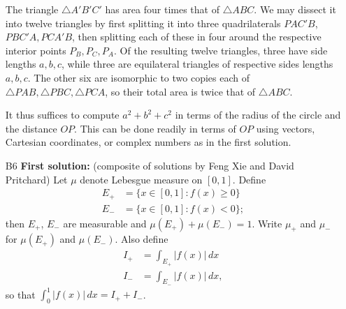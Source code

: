 \documentclass[amssymb,twocolumn,pra,10pt,aps]{revtex4-1}
\begin{document}
\begin{itemize}
The triangle $\triangle A'B'C'$ has area four times that of $\triangle ABC$.
We may dissect it into twelve triangles by first splitting it into three quadrilaterals $PAC'B$, $PBC'A, PCA'B$, then splitting each of these in four around the respective interior points $P_B, P_C, P_A$. 
Of the resulting twelve triangles, three have side lengths $a,b,c$, while three are equilateral triangles
of respective sides lengths $a,b,c$. The other six are isomorphic to two copies each of
$\triangle PAB, \triangle PBC, \triangle PCA$, so their total area is twice that of $\triangle ABC$.

It thus suffices to compute $a^2 + b^2 + c^2$ in terms of the radius of the circle and the distance $OP$.
This can be done readily in terms of
$OP$ using vectors, Cartesian coordinates, or complex numbers as in the first solution.


\item[B6]
\textbf{First solution:} (composite of solutions by Feng Xie and David
Pritchard)
Let $\mu$ denote Lebesgue measure on $[0,1]$. Define
\begin{align*}
E_+ &= \{x \in [0,1]: f(x) \geq 0\} \\
E_- &= \{x \in [0,1]: f(x) < 0\};
\end{align*}
then $E_+$, $E_-$ are measurable and $\mu(E_+) + \mu(E_-) = 1$.
Write $\mu_+$ and $\mu_-$ for $\mu(E_+)$ and $\mu(E_-)$.
Also define
\begin{align*}
I_+ &= \int_{E_+} |f(x)|\,dx \\
I_- &= \int_{E_-} |f(x)|\,dx,
\end{align*}
so that $\int_0^1 |f(x)|\,dx = I_+ + I_-$.


\end{itemize}
\end{document}
